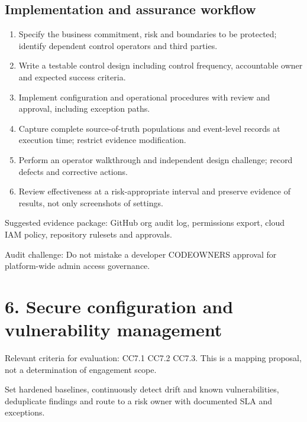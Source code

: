 \documentclass[10pt,oneside]{report}
\begin{document}
\subsection{Implementation and assurance workflow}
\begin{enumerate}
\item Specify the business commitment, risk and boundaries to be protected; identify dependent control operators and third parties.
\item Write a testable control design including control frequency, accountable owner and expected success criteria.
\item Implement configuration and operational procedures with review and approval, including exception paths.
\item Capture complete source-of-truth populations and event-level records at execution time; restrict evidence modification.
\item Perform an operator walkthrough and independent design challenge; record defects and corrective actions.
\item Review effectiveness at a risk-appropriate interval and preserve evidence of results, not only screenshots of settings.
\end{enumerate}

Suggested evidence package: GitHub org audit log, permissions export, cloud IAM policy, repository rulesets and approvals.

Audit challenge: Do not mistake a developer CODEOWNERS approval for platform-wide admin access governance.

\section{6. Secure configuration and vulnerability management}
Relevant criteria for evaluation: CC7.1 CC7.2 CC7.3. This is a mapping proposal, not a determination of engagement scope.

\begin{engineeringbox}
Set hardened baselines, continuously detect drift and known vulnerabilities, deduplicate findings and route to a risk owner with documented SLA and exceptions.
\end{engineeringbox}
\end{document}
